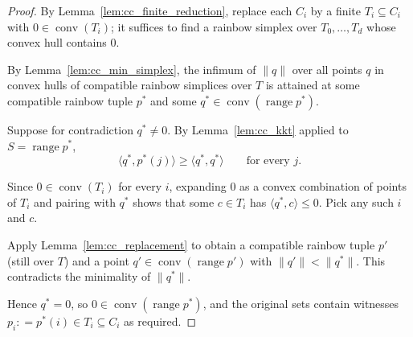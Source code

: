 \begin{proof}
By Lemma~\ref{lem:cc_finite_reduction}, replace each \(C_i\) by a
finite \(T_i \subseteq C_i\) with \(0 \in \operatorname{conv}(T_i)\);
it suffices to find a rainbow simplex over \(T_0, \dots, T_d\) whose
convex hull contains \(0\).

By Lemma~\ref{lem:cc_min_simplex}, the infimum of \(\|q\|\) over all
points \(q\) in convex hulls of compatible rainbow simplices over
\(T\) is attained at some compatible rainbow tuple \(p^{*}\) and some
\(q^{*} \in \operatorname{conv}(\operatorname{range} p^{*})\).

Suppose for contradiction \(q^{*} \neq 0\). By
Lemma~\ref{lem:cc_kkt} applied to \(S = \operatorname{range} p^{*}\),
\[
\langle q^{*}, p^{*}(j) \rangle \ge \langle q^{*}, q^{*} \rangle \qquad \text{for every } j.
\]

Since \(0 \in \operatorname{conv}(T_i)\) for every \(i\), expanding
\(0\) as a convex combination of points of \(T_i\) and pairing with
\(q^{*}\) shows that some \(c \in T_i\) has
\(\langle q^{*}, c \rangle \le 0\). Pick any such \(i\) and \(c\).

Apply Lemma~\ref{lem:cc_replacement} to obtain a compatible rainbow
tuple \(p'\) (still over \(T\)) and a point
\(q' \in \operatorname{conv}(\operatorname{range} p')\) with
\(\|q'\| < \|q^{*}\|\). This contradicts the minimality of
\(\|q^{*}\|\).

Hence \(q^{*} = 0\), so \(0 \in \operatorname{conv}(\operatorname{range} p^{*})\),
and the original sets contain witnesses \(p_i \mathrel{\mathop:}=
p^{*}(i) \in T_i \subseteq C_i\) as required.
\end{proof}
